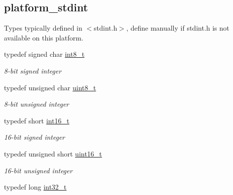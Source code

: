 \subsection*{platform\+\_\+stdint}
\label{_amgrpd25616584cb4ee40080d217a7b385214}%
Types typically defined in $<$stdint.\+h$>$, define manually if stdint.\+h is not available on this platform. \begin{DoxyCompactItemize}
\item 
\mbox{\label{group__hal__dos_ga20c38cc5aac7cc6b0a3c6ab05428436d}} 
typedef signed char \hyperlink{group__hal__dos_ga20c38cc5aac7cc6b0a3c6ab05428436d}{int8\+\_\+t}
\begin{DoxyCompactList}\small\item\em 8-\/bit signed integer \end{DoxyCompactList}\item 
\mbox{\label{group__hal__dos_gae1affc9ca37cfb624959c866a73f83c2}} 
typedef unsigned char \hyperlink{group__hal__dos_gae1affc9ca37cfb624959c866a73f83c2}{uint8\+\_\+t}
\begin{DoxyCompactList}\small\item\em 8-\/bit unsigned integer \end{DoxyCompactList}\item 
\mbox{\label{group__hal__dos_ga2140805d08462d474b82ddc8d1c2f3e6}} 
typedef short \hyperlink{group__hal__dos_ga2140805d08462d474b82ddc8d1c2f3e6}{int16\+\_\+t}
\begin{DoxyCompactList}\small\item\em 16-\/bit signed integer \end{DoxyCompactList}\item 
\mbox{\label{group__hal__dos_ga5a8b2dc9e45a9ee81a94ef304fb62505}} 
typedef unsigned short \hyperlink{group__hal__dos_ga5a8b2dc9e45a9ee81a94ef304fb62505}{uint16\+\_\+t}
\begin{DoxyCompactList}\small\item\em 16-\/bit unsigned integer \end{DoxyCompactList}\item 
\mbox{\label{group__hal__dos_gafd12020da5a235dfcf0c3c748fb5baed}} 
typedef long \hyperlink{group__hal__dos_gafd12020da5a235dfcf0c3c748fb5baed}{int32\+\_\+t}

\end{DoxyCompactItemize}
